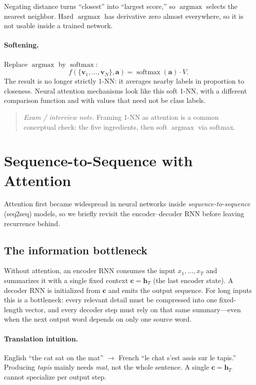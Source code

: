 \documentclass[11pt]{article}
\begin{document}
Negating distance turns ``closest'' into ``largest score,'' so
\(\operatorname{argmax}\) selects the nearest neighbor. Hard
\(\operatorname{argmax}\) has derivative zero almost everywhere, so it is
not usable inside a trained network.

\paragraph{Softening.}
Replace \(\operatorname{argmax}\) by \(\operatorname{softmax}\):
\[
  f(\{\mathbf{v}_1,\ldots,\mathbf{v}_N\},\mathbf{a})
  =
  \operatorname{softmax}(\mathbf{a})\cdot V.
\]
The result is no longer strictly 1-NN: it averages nearby labels in
proportion to closeness. Neural attention mechanisms look like this soft
1-NN, with a different comparison function and with values that need not be
class labels.

\begin{quote}
\emph{Exam / interview note.} Framing 1-NN as attention is a common
conceptual check: the five ingredients, then soft \(\operatorname{argmax}\)
via softmax.
\end{quote}

\section{Sequence-to-Sequence with Attention}

Attention first became widespread in neural networks inside
\emph{sequence-to-sequence} (seq2seq) models, so we briefly revisit the
encoder--decoder RNN before leaving recurrence behind.

\subsection{The information bottleneck}

Without attention, an encoder RNN consumes the input
\(x_1,\ldots,x_T\) and summarizes it with a single fixed context
\(\mathbf{c}=\mathbf{h}_T\) (the last encoder state). A decoder RNN is
initialized from \(\mathbf{c}\) and emits the output sequence. For long
inputs this is a bottleneck: every relevant detail must be compressed into
one fixed-length vector, and every decoder step must rely on that same
summary---even when the next output word depends on only one source word.

\paragraph{Translation intuition.}
English ``the cat sat on the mat'' \(\to\) French ``le chat s'est assis sur
le tapis.'' Producing \emph{tapis} mainly needs \emph{mat}, not the whole
sentence. A single \(\mathbf{c}=\mathbf{h}_T\) cannot specialize per output
step.
\end{document}
